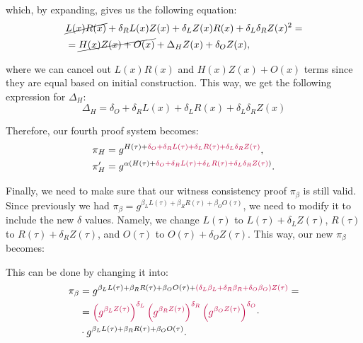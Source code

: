 \documentclass[../lecture-notes.tex]{subfiles}
\begin{document}
which, by expanding, gives us the following equation:
\begin{equation*}
    \begin{aligned}
        &\cancel{L(x)R(x)} + \delta_R L(x)Z(x) + \delta_L Z(x)R(x) + \delta_L \delta_R Z(x)^2 = \\ &= \cancel{H(x)Z(x) + O(x)} + \Delta_HZ(x) + \delta_O Z(x), \\        
    \end{aligned}
\end{equation*}

where we can cancel out $L(x)R(x)$ and $H(x)Z(x) + O(x)$ terms since they are equal based on initial construction. This way, we get the following expression for $\Delta_H$:
\begin{equation*}
    \Delta_H = \delta_O + \delta_R L(x) + \delta_L R(x) + \delta_L \delta_R Z(x)
\end{equation*}

Therefore, our fourth proof system becomes:
\begin{equation*}
    \begin{aligned}
        &\pi_H = g^{H(\tau) + \textcolor{purple}{\delta_O + \delta_R L(\tau) + \delta_L R(\tau) + \delta_L \delta_R Z(\tau)}}, \\
        &\pi_H' = g^{\alpha(H(\tau) + \textcolor{purple}{\delta_O + \delta_R L(\tau) + \delta_L R(\tau) + \delta_L \delta_R Z(\tau)})}.        
    \end{aligned}
\end{equation*}

Finally, we need to make sure that our witness consistency proof $\pi_{\beta}$ is still valid. Since previously we had $\pi_{\beta} = g^{\beta_LL(\tau) + \beta_RR(\tau) + \beta_OO(\tau)}$, we need to modify it to include the new $\delta$ values. Namely, we change $L(\tau)$ to $L(\tau)+\delta_LZ(\tau)$, $R(\tau)$ to $R(\tau)+\delta_RZ(\tau)$, and $O(\tau)$ to $O(\tau)+\delta_OZ(\tau)$. This way, our new $\pi_{\beta}$ becomes:

This can be done by changing it into:
\begin{align*}
    \pi_{\beta} &= g^{\beta_LL(\tau) + \beta_RR(\tau) + \beta_OO(\tau) + \textcolor{purple}{(\delta_L\beta_L + \delta_R\beta_R + \delta_O\beta_O)Z(\tau)}} = \\
                &= \textcolor{purple}{\left(g^{\beta_L Z(\tau)}\right)^{\delta_L}\left(g^{\beta_R Z(\tau)}\right)^{\delta_R}\left(g^{\beta_O Z(\tau)}\right)^{\delta_O}} \cdot \\ &\cdot g^{\beta_LL(\tau) + \beta_RR(\tau) + \beta_OO(\tau)}.
\end{align*}
\end{document}

